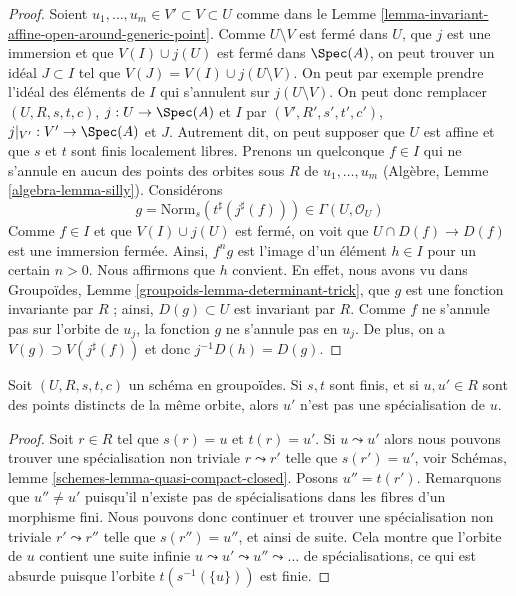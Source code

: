 \begin{proof}
Soient $u_1, \ldots, u_m \in V' \subset V \subset U$ comme dans le
Lemme \ref{lemma-invariant-affine-open-around-generic-point}.
Comme $U \setminus V$ est fermé dans $U$, que $j$ est une immersion et que $V(I) \cup j(U)$
est fermé dans $\Spec(A)$, on peut trouver un idéal
$J \subset I$ tel que $V(J) = V(I) \cup j(U \setminus V)$.
On peut par exemple prendre l'idéal des éléments de $I$ qui
s'annulent sur $j(U \setminus V)$. On peut donc remplacer
$(U, R, s, t, c)$, $j : U \to \Spec(A)$ et $I$ par
$(V', R', s', t', c')$, $j|_{V'} : V' \to \Spec(A)$ et $J$.
Autrement dit, on peut supposer que $U$ est affine et que
$s$ et $t$ sont finis localement libres.
Prenons un quelconque $f \in I$ qui ne s'annule en aucun des
points des orbites sous $R$ de $u_1, \ldots, u_m$
(Algèbre, Lemme \ref{algebra-lemma-silly}). Considérons
$$
g = \text{Norm}_s(t^\sharp(j^\sharp(f))) \in \Gamma(U, \mathcal{O}_U)
$$
Comme $f \in I$ et que $V(I) \cup j(U)$ est fermé, on voit que
$U \cap D(f) \to D(f)$ est une immersion fermée. Ainsi, $f^ng$ est
l'image d'un élément $h \in I$ pour un certain $n > 0$. Nous affirmons que $h$ convient.
En effet, nous avons vu dans
Groupoïdes, Lemme \ref{groupoids-lemma-determinant-trick},
que $g$ est une fonction invariante par $R$ ; ainsi, $D(g) \subset U$
est invariant par $R$. Comme $f$ ne s'annule pas sur l'orbite de $u_j$,
la fonction $g$ ne s'annule pas en $u_j$. De plus, on a
$V(g) \supset V(j^\sharp(f))$ et donc $j^{-1}D(h) = D(g)$.
\end{proof}

\begin{lemma}
\label{lemma-no-specializations-map-to-same-point}
Soit $(U, R, s, t, c)$ un schéma en groupoïdes. Si $s, t$ sont finis,
et si $u, u' \in R$ sont des points distincts de la même orbite,
alors $u'$ n'est pas une spécialisation de $u$.
\end{lemma}

\begin{proof}
Soit $r \in R$ tel que $s(r) = u$ et $t(r) = u'$. Si $u \leadsto u'$
alors nous pouvons trouver une spécialisation non triviale $r \leadsto r'$ telle que
$s(r') = u'$, voir 
Schémas, lemme \ref{schemes-lemma-quasi-compact-closed}.
Posons $u'' = t(r')$. Remarquons que $u'' \not = u'$ puisqu'il n'existe pas de
spécialisations dans les fibres d'un morphisme fini.
Nous pouvons donc continuer et trouver une spécialisation non triviale
$r' \leadsto r''$ telle que $s(r'') = u''$, et ainsi de suite. Cela montre que
l'orbite de $u$ contient une suite infinie
$u \leadsto u' \leadsto u'' \leadsto \ldots$
de spécialisations, ce qui est absurde puisque l'orbite
$t(s^{-1}(\{u\}))$ est finie.
\end{proof}

